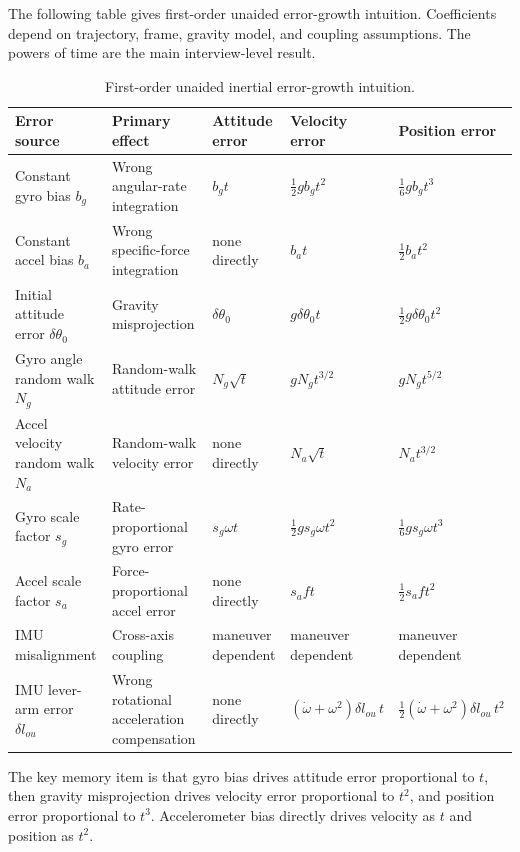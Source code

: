 \documentclass[11pt,oneside]{book}
\begin{document}
The following table gives first-order unaided error-growth intuition. Coefficients depend on trajectory, frame, gravity model, and coupling assumptions. The powers of time are the main interview-level result.

\begin{longtable}{p{}p{}p{}p{}p{}}
\caption{First-order unaided inertial error-growth intuition.}\\
\toprule
Error source & Primary effect & Attitude error & Velocity error & Position error\\
\midrule
Constant gyro bias $b_g$ & Wrong angular-rate integration & $b_g t$ & $\frac{1}{2}g b_g t^2$ & $\frac{1}{6}g b_g t^3$\\
Constant accel bias $b_a$ & Wrong specific-force integration & none directly & $b_a t$ & $\frac{1}{2}b_a t^2$\\
Initial attitude error $\delta\theta_0$ & Gravity misprojection & $\delta\theta_0$ & $g\delta\theta_0 t$ & $\frac{1}{2}g\delta\theta_0 t^2$\\
Gyro angle random walk $N_g$ & Random-walk attitude error & $N_g\sqrt{t}$ & $gN_g t^{3/2}$ & $gN_g t^{5/2}$\\
Accel velocity random walk $N_a$ & Random-walk velocity error & none directly & $N_a\sqrt{t}$ & $N_a t^{3/2}$\\
Gyro scale factor $s_g$ & Rate-proportional gyro error & $s_g\omega t$ & $\frac{1}{2}g s_g\omega t^2$ & $\frac{1}{6}g s_g\omega t^3$\\
Accel scale factor $s_a$ & Force-proportional accel error & none directly & $s_a f t$ & $\frac{1}{2}s_a f t^2$\\
IMU misalignment & Cross-axis coupling & maneuver dependent & maneuver dependent & maneuver dependent\\
IMU lever-arm error $\delta l_{ou}$ & Wrong rotational acceleration compensation & none directly & $(\dot\omega+\omega^2)\delta l_{ou}\,t$ & $\frac{1}{2}(\dot\omega+\omega^2)\delta l_{ou}\,t^2$\\
\bottomrule
\end{longtable}

\begin{interviewbox}
The key memory item is that gyro bias drives attitude error proportional to $t$, then gravity misprojection drives velocity error proportional to $t^2$, and position error proportional to $t^3$. Accelerometer bias directly drives velocity as $t$ and position as $t^2$.
\end{interviewbox}
\end{document}
